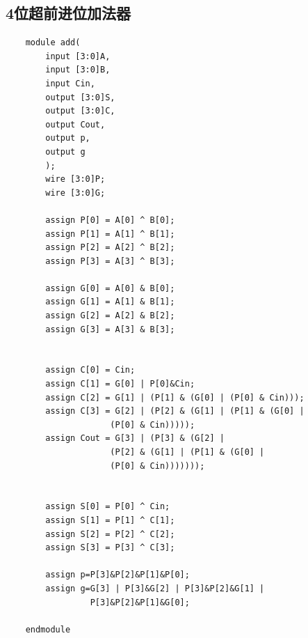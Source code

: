 \documentclass[fontset=windows,12pt]{article}
\begin{document}
    \subsection{4位超前进位加法器}
    {\setmainfont{Courier New Bold} 
    \begin{lstlisting}
    module add(
        input [3:0]A,
        input [3:0]B,
        input Cin,
        output [3:0]S,
        output [3:0]C,
        output Cout,
        output p,
        output g
        );
        wire [3:0]P;
        wire [3:0]G;
        
        assign P[0] = A[0] ^ B[0];
        assign P[1] = A[1] ^ B[1];
        assign P[2] = A[2] ^ B[2];
        assign P[3] = A[3] ^ B[3];
        
        assign G[0] = A[0] & B[0];
        assign G[1] = A[1] & B[1];
        assign G[2] = A[2] & B[2];
        assign G[3] = A[3] & B[3];
        
        
        assign C[0] = Cin;
        assign C[1] = G[0] | P[0]&Cin;
        assign C[2] = G[1] | (P[1] & (G[0] | (P[0] & Cin)));
        assign C[3] = G[2] | (P[2] & (G[1] | (P[1] & (G[0] | 
                     (P[0] & Cin)))));
        assign Cout = G[3] | (P[3] & (G[2] | 
                     (P[2] & (G[1] | (P[1] & (G[0] | 
                     (P[0] & Cin)))))));
    
            
        assign S[0] = P[0] ^ Cin;
        assign S[1] = P[1] ^ C[1]; 
        assign S[2] = P[2] ^ C[2]; 
        assign S[3] = P[3] ^ C[3]; 
        
        assign p=P[3]&P[2]&P[1]&P[0];
        assign g=G[3] | P[3]&G[2] | P[3]&P[2]&G[1] | 
                 P[3]&P[2]&P[1]&G[0];
        
    endmodule
    \end{lstlisting}}
\end{document}
